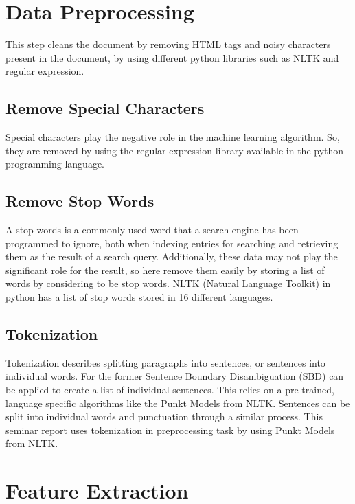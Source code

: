 \section{Data Preprocessing}
This step cleans the document by removing HTML tags and noisy characters present in the document, by using different python libraries such as NLTK and regular expression.
\subsection{Remove Special Characters}
Special characters play the negative role in the machine learning algorithm. So, they are removed by using the regular expression library available in the python programming language.
\subsection{Remove Stop Words}
A stop words is a commonly used word that a search engine has been programmed to ignore, both when indexing entries for searching and retrieving them as the result of a search query. Additionally, these data may not play the significant role for the result, so here remove them easily by storing a list of words by considering to be stop words. NLTK (Natural Language Toolkit) in python has a list of stop words stored in 16 different languages.
\subsection{Tokenization}
Tokenization describes splitting paragraphs into sentences, or sentences into individual words. For the former Sentence Boundary Disambiguation (SBD) can be applied to create a list of individual sentences. This relies on a pre-trained, language specific algorithms like the Punkt Models from NLTK. Sentences can be split into individual words and punctuation through a similar process. This seminar report uses tokenization in preprocessing task by using Punkt Models from NLTK.
\section{Feature Extraction}
